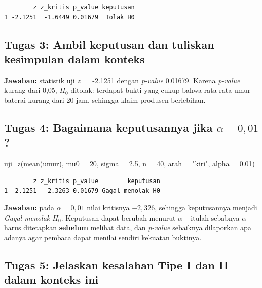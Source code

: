 \documentclass[
  indonesian,
  letterpaper,
]{book}
\newenvironment{Shaded}{\begin{snugshade}}{\end{snugshade}}
\newcommand{\AttributeTok}[1]{\textcolor[rgb]{0.40,0.45,0.13}{#1}}
\newcommand{\DecValTok}[1]{\textcolor[rgb]{0.68,0.00,0.00}{#1}}
\newcommand{\FloatTok}[1]{\textcolor[rgb]{0.68,0.00,0.00}{#1}}
\newcommand{\FunctionTok}[1]{\textcolor[rgb]{0.28,0.35,0.67}{#1}}
\newcommand{\NormalTok}[1]{\textcolor[rgb]{0.00,0.23,0.31}{#1}}
\newcommand{\StringTok}[1]{\textcolor[rgb]{0.13,0.47,0.30}{#1}}
\begin{document}
\begin{verbatim}
        z z_kritis p_value keputusan
1 -2.1251  -1.6449 0.01679  Tolak H0
\end{verbatim}

\subsection{Tugas 3: Ambil keputusan dan tuliskan kesimpulan dalam
konteks}\label{tugas-3-ambil-keputusan-dan-tuliskan-kesimpulan-dalam-konteks}

\textbf{Jawaban:} statistik uji \(z =\) -2.1251 dengan \emph{p-value}
0.01679. Karena \emph{p-value} kurang dari 0,05, \(H_0\) ditolak:
terdapat bukti yang cukup bahwa rata-rata umur baterai kurang dari 20
jam, sehingga klaim produsen berlebihan.

\subsection{\texorpdfstring{Tugas 4: Bagaimana keputusannya jika
\(\alpha = 0{,}01\)?}{Tugas 4: Bagaimana keputusannya jika \textbackslash alpha = 0\{,\}01?}}\label{tugas-4-bagaimana-keputusannya-jika-alpha-001}

\begin{Shaded}
\begin{Highlighting}[]
\FunctionTok{uji\_z}\NormalTok{(}\FunctionTok{mean}\NormalTok{(umur), }\AttributeTok{mu0 =} \DecValTok{20}\NormalTok{, }\AttributeTok{sigma =} \FloatTok{2.5}\NormalTok{, }\AttributeTok{n =} \DecValTok{40}\NormalTok{, }\AttributeTok{arah =} \StringTok{"kiri"}\NormalTok{, }\AttributeTok{alpha =} \FloatTok{0.01}\NormalTok{)}
\end{Highlighting}
\end{Shaded}

\begin{verbatim}
        z z_kritis p_value        keputusan
1 -2.1251  -2.3263 0.01679 Gagal menolak H0
\end{verbatim}

\textbf{Jawaban:} pada \(\alpha = 0{,}01\) nilai kritisnya \(-2{,}326\),
sehingga keputusannya menjadi \emph{Gagal menolak \(H_0\)}. Keputusan
dapat berubah menurut \(\alpha\) -- itulah sebabnya \(\alpha\) harus
ditetapkan \textbf{sebelum} melihat data, dan \emph{p-value} sebaiknya
dilaporkan apa adanya agar pembaca dapat menilai sendiri kekuatan
buktinya.

\subsection{Tugas 5: Jelaskan kesalahan Tipe I dan II dalam konteks
ini}\label{tugas-5-jelaskan-kesalahan-tipe-i-dan-ii-dalam-konteks-ini}
\end{document}
